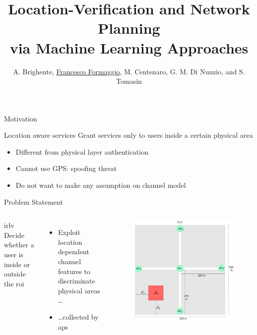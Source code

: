 \documentclass[10pt]{beamer}
\title{Location-Verification and Network Planning \\ via Machine Learning Approaches}
\author[A. Brighente, \uline{F. Formaggio}, et al.]{A. Brighente, \underline{Francesco Formaggio}, M. Centenaro, G. M. Di Nunzio, and    S. Tomasin}
\institute[Department of Information Engineering, University of Padua]{\logopdred \hspace{1cm} \logodeinew  }
\date{}
\begin{document}
\frame[plain]{\titlepage}

\begin{frame}{Motivation}
\begin{block}{Location aware services}
	Grant services only to users inside a certain physical area
\end{block}
\vspace{1cm}
\begin{itemize}
	\item Different from physical layer authentication
	\item Cannot use GPS: spoofing threat
	\item Do not want to make any assumption on channel model
\end{itemize}
\end{frame}	

\begin{frame}{Problem Statement}
\begin{columns}
	{ 	\fontsize{9}{9}
	\begin{block}{\Ac{irlv}}
			Decide whether a user is inside or outside the \ac{roi}
	\end{block}
}
\begin{itemize}
	\item Exploit location dependent channel features to discriminate physical areas \dots
	\item \dots collected by \acp{ap}
\end{itemize}
	\begin{figure}[]
		\centering
		\includegraphics[width=1\columnwidth]{scenarioBuildingWiOpt.jpg}
	\end{figure}
\end{columns}
\end{frame}
\end{document}
